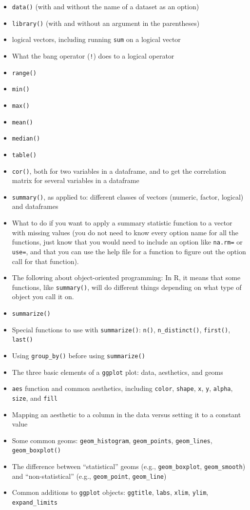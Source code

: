 \documentclass[]{book}
\providecommand{\tightlist}{%
  \setlength{\itemsep}{0pt}\setlength{\parskip}{0pt}}
\theoremstyle{definition}
\theoremstyle{definition}
\theoremstyle{definition}
\theoremstyle{remark}
\begin{document}
\begin{itemize}
\tightlist
\item
  \texttt{data()} (with and without the name of a dataset as an option)
\item
  \texttt{library()} (with and without an argument in the parentheses)
\item
  logical vectors, including running \texttt{sum} on a logical vector
\item
  What the bang operator (\texttt{!}) does to a logical operator
\item
  \texttt{range()}
\item
  \texttt{min()}
\item
  \texttt{max()}
\item
  \texttt{mean()}
\item
  \texttt{median()}
\item
  \texttt{table()}
\item
  \texttt{cor()}, both for two variables in a dataframe, and to get the
  correlation matrix for several variables in a dataframe
\item
  \texttt{summary()}, as applied to: different classes of vectors
  (numeric, factor, logical) and dataframes
\item
  What to do if you want to apply a summary statistic function to a
  vector with missing values (you do not need to know every option name
  for all the functions, just know that you would need to include an
  option like \texttt{na.rm=} or \texttt{use=}, and that you can use the
  help file for a function to figure out the option call for that
  function).
\item
  The following about object-oriented programming: In R, it means that
  some functions, like \texttt{summary()}, will do different things
  depending on what type of object you call it on.
\item
  \texttt{summarize()}
\item
  Special functions to use with \texttt{summarize()}: \texttt{n()},
  \texttt{n\_distinct()}, \texttt{first()}, \texttt{last()}
\item
  Using \texttt{group\_by()} before using \texttt{summarize()}
\item
  The three basic elements of a \texttt{ggplot} plot: data, aesthetics,
  and geoms
\item
  \texttt{aes} function and common aesthetics, including \texttt{color},
  \texttt{shape}, \texttt{x}, \texttt{y}, \texttt{alpha}, \texttt{size},
  and \texttt{fill}
\item
  Mapping an aesthetic to a column in the data versus setting it to a
  constant value
\item
  Some common geoms: \texttt{geom\_histogram}, \texttt{geom\_points},
  \texttt{geom\_lines}, \texttt{geom\_boxplot()}
\item
  The difference between ``statistical'' geoms (e.g.,
  \texttt{geom\_boxplot}, \texttt{geom\_smooth}) and ``non-statistical''
  (e.g., \texttt{geom\_point}, \texttt{geom\_line})
\item
  Common additions to \texttt{ggplot} objects: \texttt{ggtitle},
  \texttt{labs}, \texttt{xlim}, \texttt{ylim}, \texttt{expand\_limits}
\end{itemize}
\end{document}
